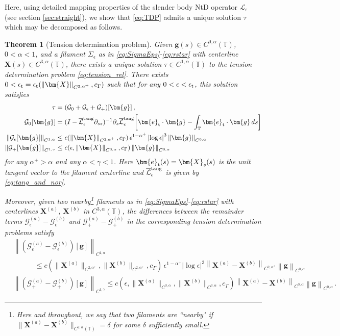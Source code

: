 \documentclass[11pt,reqno]{amsart}
\newcommand{\T}{\mathbb{T}}
\newcommand{\X}{\bm{X}}
\newcommand{\be}{\bm{e}}
\newcommand{\p}{\partial}
\newcommand{\abs}[1]{\left\lvert #1 \right\rvert}
\newcommand{\norm}[1]{\left\lVert #1 \right\rVert}
\newcommand{\mc}[1]{\mathcal{#1}}
\newtheorem{theorem}{Theorem}[section]
\theoremstyle{definition}
\begin{document}
Here, using detailed mapping properties of the slender body NtD operator $\mc{L}_\epsilon$ (see section \ref{sec:straight}), we show that \eqref{eq:TDP} admits a unique solution $\tau$ which may be decomposed as follows. 
%
%
%
\begin{theorem}[Tension determination problem]\label{thm:TDP}
Given $\bm{g}(s)\in C^{0,\alpha}(\T)$, $0<\alpha<1$, and a filament $\Sigma_\epsilon$ as in \eqref{eq:SigmaEps}-\eqref{eq:rstar} with centerline $\X(s)\in C^{3,\alpha}(\T)$, there exists a unique solution $\tau\in C^{1,\alpha}(\T)$ to the tension determination problem \eqref{eq:tension_rel}. There exists $0<\epsilon_{\rm t}=\epsilon_{\rm t}(\norm{\X}_{C^{2,\alpha^+}},c_\Gamma)$ such that for any $0<\epsilon<\epsilon_{\rm t}$, this solution satisfies 
\begin{equation}\label{eq:tau_bound}
\begin{aligned}
\tau &= (\mc{G}_0+\mc{G}_\epsilon+\mc{G}_+)[\bm{g}] \,, \\
\mc{G}_0[\bm{g}] &= (I- \overline{\mc{L}}_\epsilon^{\rm tang}\p_{ss})^{-1}\p_s\overline{\mc{L}}_\epsilon^{\rm tang}\bigg[\be_{\rm t}\cdot\bm{g}-\int_{\T}\be_{\rm t}\cdot\bm{g}\,ds \bigg]\\  
\norm{\mc{G}_\epsilon[\bm{g}]}_{C^{1,\alpha}} &\le c(\norm{\X}_{C^{2,\alpha^+}},c_\Gamma)\,\epsilon^{1-\alpha^+}\abs{\log\epsilon}^3\norm{\bm{g}}_{C^{0,\alpha}}\\
\norm{\mc{G}_+[\bm{g}]}_{C^{1,\gamma}} &\le c(\epsilon,\norm{\X}_{C^{3,\alpha}},c_\Gamma)\norm{\bm{g}}_{C^{0,\alpha}}
\end{aligned}
\end{equation}
for any $\alpha^+>\alpha$ and any $\alpha<\gamma<1$. Here $\be_{\rm t}(s)=\X_s(s)$ is the unit tangent vector to the filament centerline and $\overline{\mc{L}}_\epsilon^{\rm tang}$ is given by \eqref{eq:tang_and_nor}.

Moreover, given two nearby\footnote{Here and throughout, we say that two filaments are ``nearby" if $\|\X^{(a)}-\X^{(b)}\|_{C^{2,\alpha}(\T)}=\delta$ for some $\delta$ sufficiently small.} filaments as in \eqref{eq:SigmaEps}-\eqref{eq:rstar} with centerlines $\X^{(a)}$, $\X^{(b)}$ in $C^{3,\alpha}(\T)$, the differences between the remainder terms $\mc{G}_\epsilon^{(a)}-\mc{G}_\epsilon^{(b)}$ and $\mc{G}_+^{(a)}-\mc{G}_+^{(b)}$ in the corresponding tension determination problems satisfy
\begin{equation}\label{eq:tau_bound_lip}
\begin{aligned}
  &\norm{(\mc{G}_\epsilon^{(a)}-\mc{G}_\epsilon^{(b)})[\bm{g}]}_{C^{1,\alpha}}\\
  &\quad\qquad\le c(\|\X^{(a)}\|_{C^{2,\alpha^+}},\|\X^{(b)}\|_{C^{2,\alpha^+}},c_\Gamma)\,\epsilon^{1-\alpha^+}\abs{\log\epsilon}^3\norm{\X^{(a)}-\X^{(b)}}_{C^{2,\alpha^+}}\norm{\bm{g}}_{C^{0,\alpha}}\\
  &\norm{(\mc{G}_+^{(a)}-\mc{G}_+^{(b)})[\bm{g}]}_{C^{1,\gamma}}\le c(\epsilon,\|\X^{(a)}\|_{C^{3,\alpha}},\|\X^{(b)}\|_{C^{3,\alpha}},c_\Gamma)\norm{\X^{(a)}-\X^{(b)}}_{C^{3,\alpha}}\norm{\bm{g}}_{C^{0,\alpha}}\,.
\end{aligned}
\end{equation}

\end{theorem}
\end{document}
